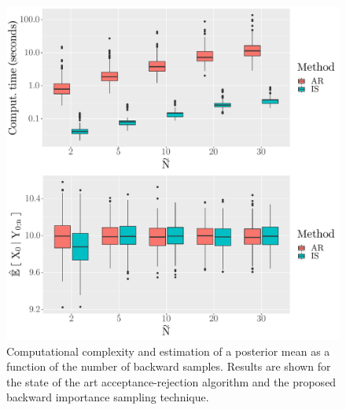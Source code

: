 \documentclass{article}
\begin{document}
\begin{figure}[h]
\begin{center}
\includegraphics[scale = .4]{comparing_IS_AR_Ntilde_vary.pdf}
\end{center}
\caption{Computational complexity and estimation of a posterior mean as a function of the number of backward samples. Results are shown for the state of the art acceptance-rejection algorithm and the proposed backward importance sampling technique.}
\label{fig:sine:timeandbias}
\end{figure}
\end{document}
